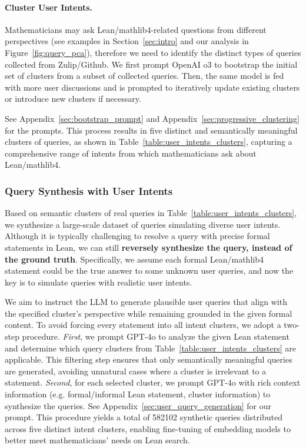\documentclass{article} %
\begin{document}
\paragraph{Cluster User Intents.}

Mathematicians may ask Lean/mathlib4-related questions from different perspectives (see examples in Section~\ref{sec:intro} and our analysis in 
Figure~\ref{fig:query_pca}),
therefore we need to identify the distinct types of queries collected from Zulip/Github. We first prompt OpenAI o3 to bootstrap the initial set of clusters from a subset of collected queries. Then, the same model is fed with more user discussions and is prompted to iteratively update existing clusters or introduce new clusters if necessary.

See Appendix~\ref{sec:bootstrap_prompt} and Appendix~\ref{sec:progressive_clustering} for the prompts.
This process results in five distinct and semantically meaningful clusters of queries, as shown in Table~\ref{table:user_intents_clusters},
capturing a comprehensive range of intents from which mathematicians ask about Lean/mathlib4.




\subsubsection{Query Synthesis with User Intents}
\label{sec:query_synthesis_perspectives}
Based on semantic clusters of real queries in Table~\ref{table:user_intents_clusters}, we synthesize a large-scale dataset of queries simulating diverse user intents.
Although it is typically challenging to resolve a query with precise formal statements in Lean,
we can still \textbf{reversely synthesize the query, instead of the ground truth}.
Specifically, we assume each formal Lean/mathlib4 statement could be the true answer to some unknown user queries, and now the key is to simulate queries with realistic user intents.


We aim to instruct the LLM to generate plausible user queries that align with the specified cluster’s perspective while remaining grounded in the given formal content. 
To avoid forcing every statement into all intent clusters, we adopt a two-step procedure. 
\emph{First}, we prompt GPT-4o to analyze the given Lean statement and determine which query clusters from Table~\ref{table:user_intents_clusters} are applicable. This filtering step ensures that only semantically meaningful queries are generated, avoiding unnatural cases where a cluster is irrelevant to a statement.
\emph{Second}, for each selected cluster, we prompt GPT-4o with rich context information (e.g. formal/informal Lean statement, cluster information) to synthesize the queries.
See Appendix~\ref{sec:user_query_generation} for our prompt.
This procedure yields a total of 582102 synthetic queries distributed across five distinct intent clusters, enabling fine-tuning of embedding models to better meet mathematicians' needs on Lean search.
\end{document}

